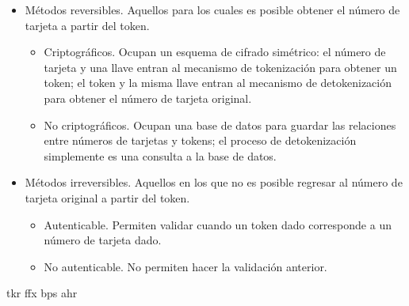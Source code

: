 \begin{itemize}
  \item Métodos reversibles. Aquellos para los cuales es posible obtener el
    número de tarjeta a partir del token.
    \begin{itemize}
      \item Criptográficos. Ocupan un esquema de cifrado simétrico: el número
        de tarjeta y una llave entran al mecanismo de tokenización para obtener
        un token; el token y la misma llave entran al mecanismo de
        detokenización para obtener el número de tarjeta original.
      \item No criptográficos. Ocupan una base de datos para guardar las
        relaciones entre números de tarjetas y tokens; el proceso de
        detokenización simplemente es una consulta a la base de datos.
    \end{itemize}
  \item Métodos irreversibles. Aquellos en los que no es posible regresar al
    número de tarjeta original a partir del token.
    \begin{itemize}
      \item Autenticable. Permiten validar cuando un token dado corresponde a
        un número de tarjeta dado.
      \item No autenticable. No permiten hacer la validación anterior.
    \end{itemize}
\end{itemize}

{tkr}
{ffx}
{bps}
{ahr}
